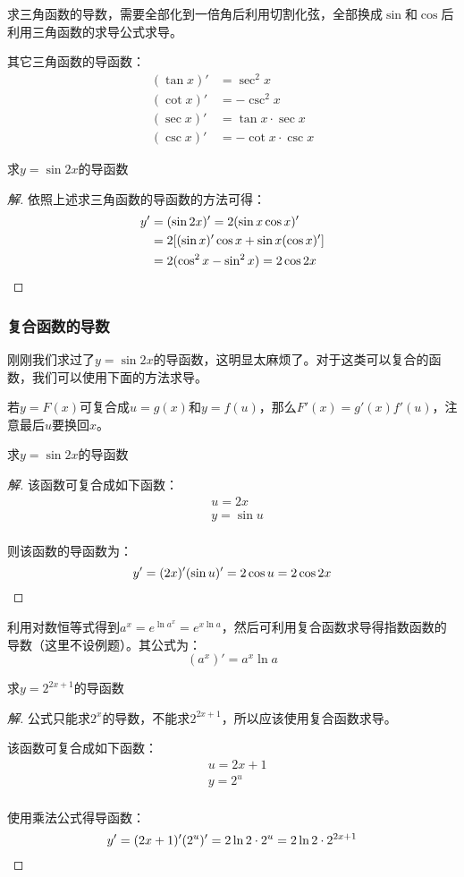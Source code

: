 \noindent\dotfill

求三角函数的导数，需要全部化到一倍角后利用切割化弦，全部换成$\sin$和$\cos$后利用三角函数的求导公式求导。

其它三角函数的导函数：
\[
	\begin{aligned}
		(\tan x)'&=\sec^2x \\
		(\cot x)'&=-\csc^2x \\
		(\sec x)'&=\tan x\cdot\sec x \\
		(\csc x)'&=-\cot x\cdot\csc x
	\end{aligned}
\]

\begin{example}
	求$y=\sin2x$的导函数
\end{example}
\begin{proof}[解]
	依照上述求三角函数的导函数的方法可得：
	\[\begin{aligned}
		y'&=(\sin2x)'=2(\sin x\cos x)' \\
		  &=2[(\sin x)'\cos x+\sin x(\cos x)'] \\
		  &=2(\cos^2x-\sin^2x)=2\cos2x
	\end{aligned}\qedhere\]
\end{proof}

\subsubsection{复合函数的导数}
刚刚我们求过了$y=\sin2x$的导函数，这明显太麻烦了。对于这类可以复合的函数，我们可以使用下面的方法求导。

若$y=F(x)$可复合成$u=g(x)$和$y=f(u)$，那么$F'(x)=g'(x)f'(u)$，注意最后$u$要换回$x$。

\begin{example}
	求$y=\sin2x$的导函数
\end{example}
\begin{proof}[解]
	该函数可复合成如下函数：
	\[\begin{aligned}
		&u=2x \\
		&y=\sin u \\
	\end{aligned}\]

	则该函数的导函数为：\[y'=(2x)'(\sin u)'=2\cos u=2\cos 2x\qedhere\]
\end{proof}

利用对数恒等式得到$a^x=e^{\ln a^x}=e^{x\ln a}$，然后可利用复合函数求导得指数函数的导数（这里不设例题）。其公式为：\[(a^x)'=a^x\ln a\]

\begin{example}
	求$y=2^{2x+1}$的导函数
\end{example}
\begin{proof}[解]
	公式只能求$2^x$的导数，不能求$2^{2x+1}$，所以应该使用复合函数求导。

	该函数可复合成如下函数：
	\[\begin{aligned}
		&u=2x+1 \\
		&y=2^u \\
	\end{aligned}\]

	使用乘法公式得导函数：\[y'=(2x+1)'(2^u)'=2\ln 2\cdot2^u=2\ln2\cdot2^{2x+1}\qedhere\]
\end{proof}

